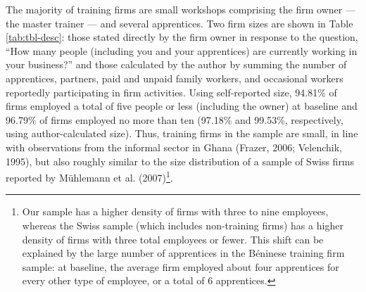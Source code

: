 \documentclass[
  11pt,
a4paper
]{article}
\begin{document}
The majority of training firms are small workshops comprising the firm owner --- the master trainer --- and several apprentices. Two firm sizes are shown in Table \ref{tab:tbl-desc}: those stated directly by the firm owner in response to the question, ``How many people (including you and your apprentices) are currently working in your business?'' and those calculated by the author by summing the number of apprentices, partners, paid and unpaid family workers, and occasional workers reportedly participating in firm activities. Using self-reported size, 94.81\% of firms employed a total of five people or less (including the owner) at baseline and 96.79\% of firms employed no more than ten (97.18\% and 99.53\%, respectively, using author-calculated size). Thus, training firms in the sample are small, in line with observations from the informal sector in Ghana (Frazer, 2006; Velenchik, 1995), but also roughly similar to the size distribution of a sample of Swiss firms reported by Mühlemann et al. (2007)\footnote{Our sample has a higher density of firms with three to nine employees, whereas the Swiss sample (which includes non-training firms) has a higher density of firms with three total employees or fewer. This shift can be explained by the large number of apprentices in the Béninese training firm sample: at baseline, the average firm employed about four apprentices for every other type of employee, or a total of 6 apprentices.}.
\end{document}

